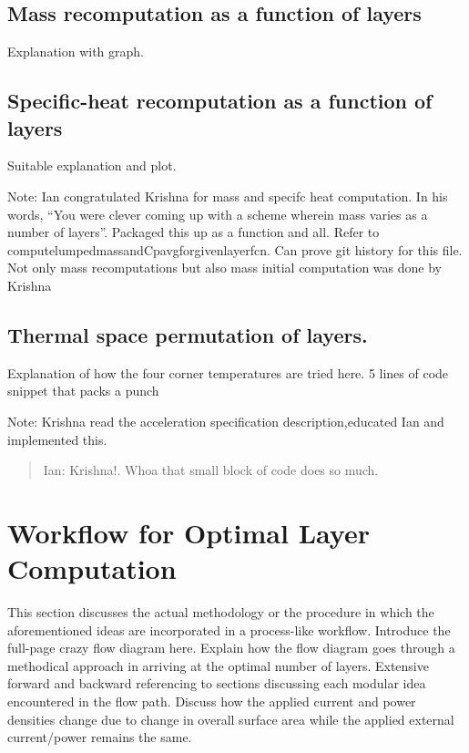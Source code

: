 \subsection{Mass recomputation as a function of layers}
Explanation with graph.

\subsection{Specific-heat recomputation as a function of layers}
Suitable explanation and plot.

Note: Ian  congratulated Krishna for mass  and specifc heat computation.  In his
words,  ``You were  clever coming  up with  a scheme  wherein mass  varies as  a
number  of  layers''.  Packaged  this  up  as  a  function  and  all.  Refer  to
computelumpedmassandCpavgforgivenlayerfcn. Can prove git  history for this file.
Not  only mass  recomputations but  also mass  initial computation  was done  by
Krishna

\subsection{Thermal space permutation of layers.}
Explanation of how the four corner temperatures are tried here. 5 lines of code snippet that packs a punch

Note: Krishna read the acceleration specification description,educated Ian and implemented this.

\begin{quotation}
Ian: Krishna!. Whoa that small block of code does so much.
\end{quotation}

\section{Workflow for Optimal Layer Computation}

This section  discusses the  actual methodology  or the  procedure in  which the
aforementioned ideas are incorporated in  a process-like workflow. Introduce the
full-page crazy flow  diagram here. Explain how the flow  diagram goes through a
methodical  approach in  arriving at  the  optimal number  of layers.  Extensive
forward  and  backward referencing  to  sections  discussing each  modular  idea
encountered  in  the flow  path.  Discuss  how  the  applied current  and  power
densities  change due  to  change  in overall  surface  area  while the  applied
external current/power remains the same.

